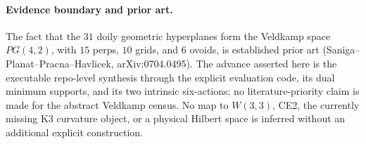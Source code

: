 \paragraph{Evidence boundary and prior art.}
The fact that the $31$ doily geometric hyperplanes form the Veldkamp space
$PG(4,2)$, with $15$ perps, $10$ grids, and $6$ ovoids, is established prior
art (Saniga--Planat--Pracna--Havlicek, arXiv:0704.0495). The advance asserted
here is the executable repo-level synthesis through the explicit evaluation
code, its dual minimum supports, and its two intrinsic six-actions; no
literature-priority claim is made for the abstract Veldkamp census. No map to
$W(3,3)$, CE2, the currently missing K3 curvature object, or a physical Hilbert
space is inferred without an additional explicit construction.
